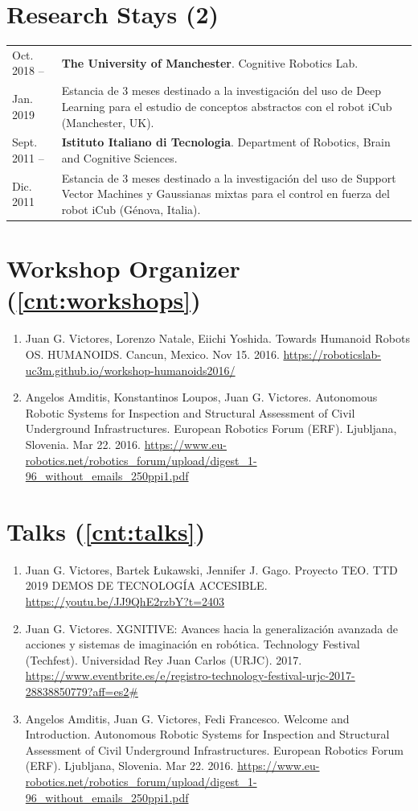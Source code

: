 \documentclass{article}
\begin{document}
\section*{Research Stays (2)}
\begin{tabular}{l p{14cm}}
Oct. 2018 --&{\bf The University of Manchester}. Cognitive Robotics Lab.\\
Jan. 2019&Estancia de 3 meses destinado a la investigación del uso de Deep Learning para el estudio de conceptos abstractos con el robot iCub (Manchester, UK).\\
\rule{0pt}{4ex}
Sept. 2011 --&{\bf Istituto Italiano di Tecnologia}. Department of Robotics, Brain and Cognitive Sciences.\\
Dic. 2011&Estancia de 3 meses destinado a la investigación del uso de Support Vector Machines y Gaussianas mixtas para el control en fuerza del robot iCub (Génova, Italia).
\end{tabular}

\section*{Workshop Organizer (\ref*{cnt:workshops})}
\begin{enumerate}
\item Juan G. Victores, Lorenzo Natale, Eiichi Yoshida. Towards Humanoid Robots OS. HUMANOIDS. Cancun, Mexico. Nov 15. 2016. \url{https://roboticslab-uc3m.github.io/workshop-humanoids2016/}
\item \label{cnt:workshops} Angelos Amditis, Konstantinos Loupos, Juan G. Victores. Autonomous Robotic Systems for Inspection and Structural Assessment of Civil Underground Infrastructures. European Robotics Forum (ERF). Ljubljana, Slovenia. Mar 22. 2016. \url{https://www.eu-robotics.net/robotics\_forum/upload/digest\_1-96\_without\_emails\_250ppi1.pdf}
\end{enumerate}

\section*{Talks (\ref*{cnt:talks})}
\begin{enumerate}
\item Juan G. Victores, Bartek Łukawski, Jennifer J. Gago. Proyecto TEO. TTD 2019 DEMOS DE TECNOLOGÍA ACCESIBLE. \url{https://youtu.be/JJ9QhE2rzbY?t=2403}
\item Juan G. Victores. XGNITIVE: Avances hacia la generalización avanzada de acciones y sistemas de imaginación en robótica. Technology Festival (Techfest). Universidad Rey Juan Carlos (URJC). 2017. \url{https://www.eventbrite.es/e/registro-technology-festival-urjc-2017-28838850779?aff=es2#}
\item \label{cnt:talks} Angelos Amditis, Juan G. Victores, Fedi Francesco. Welcome and Introduction. Autonomous Robotic Systems for Inspection and Structural Assessment of Civil Underground Infrastructures. European Robotics Forum (ERF). Ljubljana, Slovenia. Mar 22. 2016. \url{https://www.eu-robotics.net/robotics\_forum/upload/digest\_1-96\_without\_emails\_250ppi1.pdf}
\end{enumerate}
\end{document}
